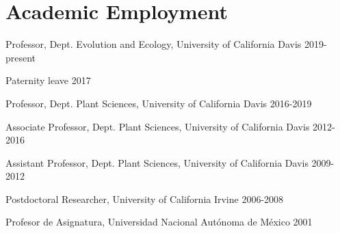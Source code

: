 \documentclass[letterpaper,10pt]{article}
\renewenvironment{itemize}{
  \begin{list}{}{
    \setlength{\leftmargin}{1.5em}
  }
}{
  \end{list}
}
\begin{document}
\section*{Academic Employment}
\begin{itemize}
\setlength\itemsep{0ex}
\item Professor, Dept. Evolution and Ecology, University of California Davis 2019-present
\item Paternity leave 2017
\item Professor, Dept. Plant Sciences, University of California Davis 2016-2019
\item Associate Professor, Dept. Plant Sciences, University of California Davis 2012-2016
\item Assistant Professor, Dept. Plant Sciences, University of California Davis 2009-2012
\item Postdoctoral Researcher, University of California Irvine 2006-2008
\item Profesor de Asignatura, Universidad Nacional Aut\'{o}noma de M\'{e}xico 2001
\end{itemize}

\end{document}
